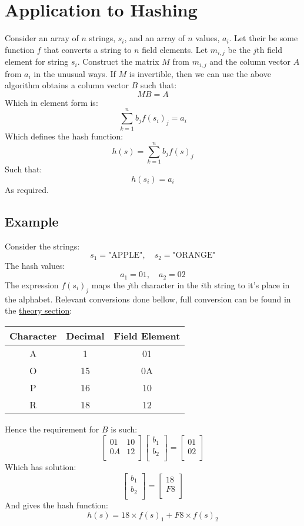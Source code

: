 \section{Application to Hashing}
Consider an array of $n$ strings, $s_i$, and an array of $n$ values, $a_i$.
Let their be some function $f$ that converts a string to $n$ field elements.
Let $m_{i,j}$ be the $j$th field element for string $s_i$.
Construct the matrix $M$ from $m_{i,j}$ and the column vector $A$ from $a_i$ in the unusual ways.
If $M$ is invertible, then we can use the above algorithm obtains a column vector $B$ such that:
\[MB = A\]
Which in element form is:
\[\sum_{k=1}^nb_jf(s_i)_j = a_i\]
Which defines the hash function:
\[h(s)=\sum_{k=1}^nb_jf(s)_j\]
Such that:
\[h(s_i) = a_i\]
As required.

\subsection{Example}
Consider the strings:
\[s_1 = \text{"APPLE"},\quad s_2 = \text{"ORANGE"} \]
The hash values:
\[a_1 = 01,\quad a_2 = 02\]
The expression $f(s_i)_j$ maps the $j$th character in the $i$th string to it's place in the alphabet.
Relevant conversions done bellow,
full conversion can be found in the \hyperref[theory:byte]{theory section}:

\begin{center}
\begin{tabular}{|c|c|c|}
	\hline
	Character & Decimal & Field Element \\	
	\hline
	A &  1 & 01 \\
	O & 15 & 0A \\
	P & 16 & 10 \\
	R & 18 & 12 \\
	\hline
\end{tabular}
\end{center}

Hence the requirement for $B$ is such:
\[ 
\begin{bmatrix}
	01&10\\
	0A&12\\
\end{bmatrix}
\begin{bmatrix}
	b_1 \\ b_2\\
\end{bmatrix}
=
\begin{bmatrix}
	01\\ 02 \\
\end{bmatrix}
\]
Which has solution:
\[
\begin{bmatrix}
	b_1 \\ b_2\\
\end{bmatrix}
=
\begin{bmatrix}
	18\\F8 \\
\end{bmatrix}
\]
And gives the hash function:
\[h(s) = 18\times f(s)_1+F8\times f(s)_2\]

